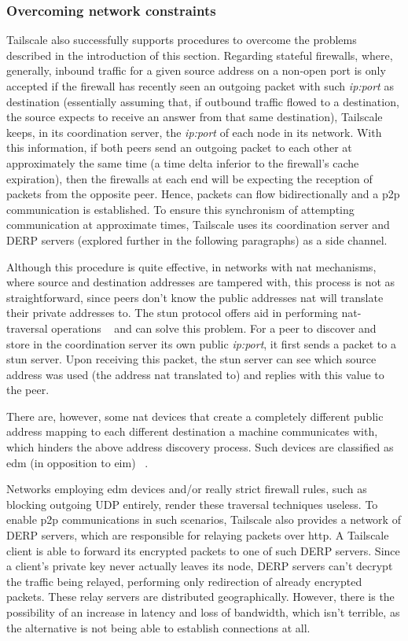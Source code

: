 \documentclass[11pt,twoside,a4paper]{report}
\begin{document}
\subsubsection{Overcoming network constraints}

Tailscale also successfully supports procedures to overcome the problems described in the introduction of this section. Regarding stateful firewalls, where, generally, inbound traffic for a given source address on a non-open port is only accepted if the firewall has recently seen an outgoing packet with such \emph{ip:port} as destination (essentially assuming that, if outbound traffic flowed to a destination, the source expects to receive an answer from that same destination), Tailscale keeps, in its coordination server, the \emph{ip:port} of each node in its network. With this information, if both peers send an outgoing packet to each other at approximately the same time (a time delta inferior to the firewall's cache expiration), then the firewalls at each end will be expecting the reception of packets from the opposite peer. Hence, packets can flow bidirectionally and a \ac{p2p} communication is established. To ensure this synchronism of attempting communication at approximate times, Tailscale uses its coordination server and \ac{DERP} servers (explored further in the following paragraphs) as a side channel.

Although this procedure is quite effective, in networks with \ac{nat} mechanisms, where source and destination addresses are tampered with, this process is not as straightforward, since peers don't know the public addresses \ac{nat} will translate their private addresses to. The \ac{stun} protocol offers aid in performing \ac{nat}-traversal operations ~\cite{rfc8489} and can solve this problem. For a peer to discover and store in the coordination server its own public \emph{ip:port}, it first sends a packet to a \ac{stun} server. Upon receiving this packet, the \ac{stun} server can see which source address was used (the address \ac{nat} translated to) and replies with this value to the peer.

There are, however, some \ac{nat} devices that create a completely different public address mapping to each different destination a machine communicates with, which hinders the above address discovery process. Such devices are classified as \ac{edm} (in opposition to \ac{eim}) ~\cite{rfc4787}.

Networks employing \ac{edm} devices and/or really strict firewall rules, such as blocking outgoing UDP entirely, render these traversal techniques useless. To enable \ac{p2p} communications in such scenarios, Tailscale also provides a network of \ac{DERP} servers, which are responsible for relaying packets over \ac{http}. A Tailscale client is able to forward its encrypted packets to one of such \ac{DERP} servers. Since a client's private key never actually leaves its node, \ac{DERP} servers can't decrypt the traffic being relayed, performing only redirection of already encrypted packets. These relay servers are distributed geographically. However, there is the possibility of an increase in latency and loss of bandwidth, which isn't terrible, as the alternative is not being able to establish connections at all.
\end{document}
